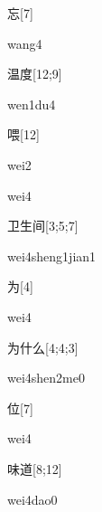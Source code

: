 \begin{verbete}[wang4]{忘}[7]
\begin{pronuncia}{wang4}
\end{pronuncia}
\end{verbete}

\begin{verbete}[wen1du4]{温度}[12;9]
\begin{pronuncia}{wen1du4}
\end{pronuncia}
\end{verbete}

\begin{verbete}[wei2]{喂}[12]
\begin{pronuncia}{wei2}
\end{pronuncia}
\begin{pronuncia}{wei4}
\end{pronuncia}
\end{verbete}

\begin{verbete}{卫生间}[3;5;7]
\begin{pronuncia}{wei4sheng1jian1}
\end{pronuncia}
\end{verbete}

\begin{verbete}[wei4]{为}[4]
\begin{pronuncia}{wei4}
\end{pronuncia}
\end{verbete}

\begin{verbete}{为什么}[4;4;3]
\begin{pronuncia}{wei4shen2me0}
\end{pronuncia}
\end{verbete}

\begin{verbete}[wei4]{位}[7]
\begin{pronuncia}{wei4}
\end{pronuncia}
\end{verbete}

\begin{verbete}{味道}[8;12]
\begin{pronuncia}{wei4dao0}
\end{pronuncia}
\end{verbete}

